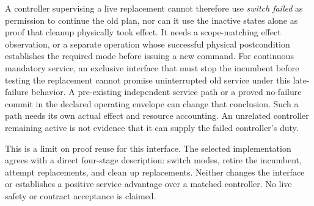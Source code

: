 \documentclass{article}
\begin{document}
A controller supervising a live replacement cannot therefore use \emph{switch failed} as permission to continue the old plan, nor can it use the inactive states alone as proof that cleanup physically took effect. It needs a scope-matching effect observation, or a separate operation whose successful physical postcondition establishes the required mode before issuing a new command. For continuous mandatory service, an exclusive interface that must stop the incumbent before testing the replacement cannot promise uninterrupted old service under this late-failure behavior. A pre-existing independent service path or a proved no-failure commit in the declared operating envelope can change that conclusion. Such a path needs its own actual effect and resource accounting. An unrelated controller remaining active is not evidence that it can supply the failed controller's duty.

This is a limit on proof reuse for this interface. The selected implementation agrees with a direct four-stage description: switch modes, retire the incumbent, attempt replacements, and clean up replacements. Neither changes the interface or establishes a positive service advantage over a matched controller. No live safety or contract acceptance is claimed.
\end{document}
